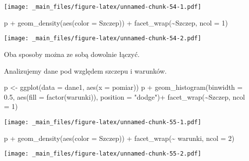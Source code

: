\documentclass[
]{book}
\newenvironment{Shaded}{\begin{snugshade}}{\end{snugshade}}
\newcommand{\AttributeTok}[1]{\textcolor[rgb]{0.77,0.63,0.00}{#1}}
\newcommand{\DecValTok}[1]{\textcolor[rgb]{0.00,0.00,0.81}{#1}}
\newcommand{\FloatTok}[1]{\textcolor[rgb]{0.00,0.00,0.81}{#1}}
\newcommand{\FunctionTok}[1]{\textcolor[rgb]{0.00,0.00,0.00}{#1}}
\newcommand{\NormalTok}[1]{#1}
\newcommand{\OtherTok}[1]{\textcolor[rgb]{0.56,0.35,0.01}{#1}}
\newcommand{\SpecialCharTok}[1]{\textcolor[rgb]{0.00,0.00,0.00}{#1}}
\newcommand{\StringTok}[1]{\textcolor[rgb]{0.31,0.60,0.02}{#1}}
\begin{document}
\texttt{[image: \_main\_files/figure-latex/unnamed-chunk-54-1.pdf]}

\begin{Shaded}
\begin{Highlighting}[]
\NormalTok{p }\SpecialCharTok{+} \FunctionTok{geom\_density}\NormalTok{(}\FunctionTok{aes}\NormalTok{(}\AttributeTok{color =}\NormalTok{ Szczep)) }\SpecialCharTok{+} \FunctionTok{facet\_wrap}\NormalTok{(}\SpecialCharTok{\textasciitilde{}}\NormalTok{Szczep, }\AttributeTok{ncol =} \DecValTok{1}\NormalTok{)}
\end{Highlighting}
\end{Shaded}

\texttt{[image: \_main\_files/figure-latex/unnamed-chunk-54-2.pdf]}

Oba sposoby można ze sobą dowolnie łączyć.

Analizujemy dane pod względem szczepu i warunków.

\begin{Shaded}
\begin{Highlighting}[]
\NormalTok{p }\OtherTok{\textless{}{-}} \FunctionTok{ggplot}\NormalTok{(}\AttributeTok{data =}\NormalTok{ dane1, }\FunctionTok{aes}\NormalTok{(}\AttributeTok{x =}\NormalTok{ pomiar))}
\NormalTok{p }\SpecialCharTok{+} \FunctionTok{geom\_histogram}\NormalTok{(}\AttributeTok{binwidth =} \FloatTok{0.5}\NormalTok{, }\FunctionTok{aes}\NormalTok{(}\AttributeTok{fill =} \FunctionTok{factor}\NormalTok{(warunki)), }\AttributeTok{position =} \StringTok{"dodge"}\NormalTok{)}\SpecialCharTok{+}
  \FunctionTok{facet\_wrap}\NormalTok{(}\SpecialCharTok{\textasciitilde{}}\NormalTok{Szczep, }\AttributeTok{ncol =} \DecValTok{1}\NormalTok{)}
\end{Highlighting}
\end{Shaded}

\texttt{[image: \_main\_files/figure-latex/unnamed-chunk-55-1.pdf]}

\begin{Shaded}
\begin{Highlighting}[]
\NormalTok{p }\SpecialCharTok{+} \FunctionTok{geom\_density}\NormalTok{(}\FunctionTok{aes}\NormalTok{(}\AttributeTok{color =}\NormalTok{ Szczep)) }\SpecialCharTok{+} \FunctionTok{facet\_wrap}\NormalTok{(}\SpecialCharTok{\textasciitilde{}}\NormalTok{ warunki, }\AttributeTok{ncol =} \DecValTok{2}\NormalTok{)}
\end{Highlighting}
\end{Shaded}

\texttt{[image: \_main\_files/figure-latex/unnamed-chunk-55-2.pdf]}
\end{document}
